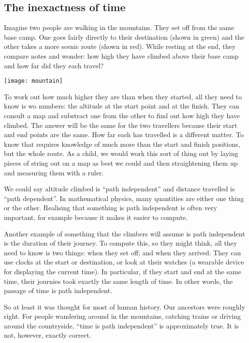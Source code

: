 \documentclass[a4paper]{report}
\begin{document}
\subsection*{The inexactness of time}
Imagine two people are walking in the mountains. They set off from the same base camp. One goes fairly directly to their destination (shown in green) and the other takes a more scenic route (shown in red). While resting at the end, they compare notes and wonder: how high they have climbed above their base camp and how far did they each travel?

\texttt{[image: mountain]}

To work out how much higher they are than when they started, all they need to know is wo numbers: the altitude at the start point and at the finish. They can consult a map and substract one from the other to find out how high they have climbed. The answer will be the same for the two travellers because their start and end points are the same. 
How far each has travelled is a different matter. To know that requires knowledge of much more than the start and finish positions, but the whole route. As a child, we would work this sort of thing out by laying pieces of string out on a map as best we could and then straightening them up and measuring them with a ruler. 

We could say altitude climbed is ``path independent'' and distance travelled is ``path dependent''. In mathematical physics, many quantities are either one thing or the other. Realising that something is path independent is often very important, for example  because it makes it easier to compute. 

Another example of something that the climbers will assume is path independent is the duration of their journey. To compute this, so they might think, all they need to know is two things: when they set off; and when they arrived. They can use clocks at the start or destination, or look at their watches (a wearable device for displaying the current time). In particular, if they start and end at the same time, their journies took exactly the same length of time. In other words, the passage of time is path independent.

So at least it was thought for most of human history. Our ancestors were roughly right. For people wandering around in the mountains, catching trains or driving around the countryside, ``time is path independent'' is approximately true. It is not, however, exactly correct. 
\end{document}
